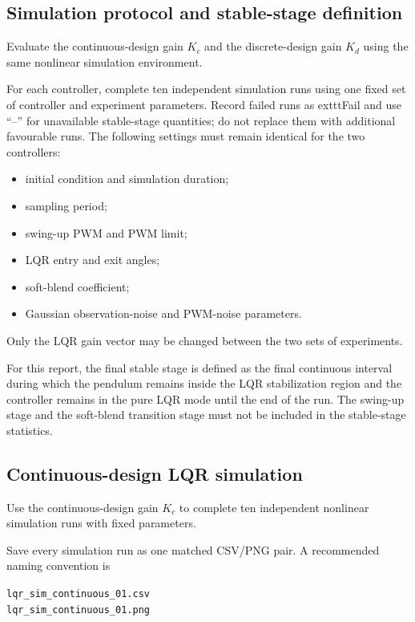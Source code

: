 \documentclass[11pt,a4paper]{article}
\begin{document}
\subsection{Simulation protocol and stable-stage definition}

Evaluate the continuous-design gain $K_c$ and the discrete-design gain $K_d$
using the same nonlinear simulation environment.

For each controller, complete ten independent simulation runs using one fixed
set of controller and experiment parameters. Record failed runs as 	exttt{Fail}
and use ``--'' for unavailable stable-stage quantities; do not replace them with
additional favourable runs.
The following settings must remain identical for the two controllers:

\begin{itemize}
    \item initial condition and simulation duration;
    \item sampling period;
    \item swing-up PWM and PWM limit;
    \item LQR entry and exit angles;
    \item soft-blend coefficient;
    \item Gaussian observation-noise and PWM-noise parameters.
\end{itemize}

Only the LQR gain vector may be changed between the two sets of experiments.

For this report, the final stable stage is defined as the final continuous
interval during which the pendulum remains inside the LQR stabilization region
and the controller remains in the pure LQR mode until the end of the run.
The swing-up stage and the soft-blend transition stage must not be included in
the stable-stage statistics.


\subsection{Continuous-design LQR simulation}

Use the continuous-design gain $K_c$ to complete ten independent nonlinear
simulation runs with fixed parameters.

Save every simulation run as one matched CSV/PNG pair. A recommended naming
convention is

\begin{center}
\texttt{lqr\_sim\_continuous\_01.csv}\\
\texttt{lqr\_sim\_continuous\_01.png}
\end{center}
\end{document}
